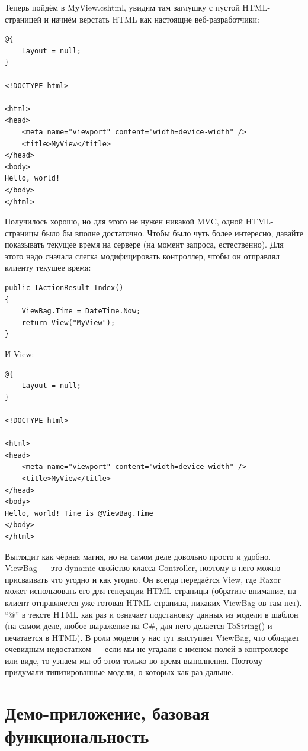 \documentclass[a5paper]{article}
\begin{document}
Теперь пойдём в MyView.cshtml, увидим там заглушку с пустой HTML-страницей и начнём верстать HTML как настоящие веб-разработчики:

\begin{verbatim}
@{
    Layout = null;
}

<!DOCTYPE html>

<html>
<head>
    <meta name="viewport" content="width=device-width" />
    <title>MyView</title>
</head>
<body>
Hello, world!
</body>
</html>
\end{verbatim}

Получилось хорошо, но для этого не нужен никакой MVC, одной HTML-страницы было бы вполне достаточно. Чтобы было чуть более интересно, давайте показывать текущее время на сервере (на момент запроса, естественно). Для этого надо сначала слегка модифицировать контроллер, чтобы он отправлял
клиенту текущее время:

\begin{verbatim}
public IActionResult Index()
{
    ViewBag.Time = DateTime.Now;
    return View("MyView");
}
\end{verbatim}

И View:

\begin{verbatim}
@{
    Layout = null;
}

<!DOCTYPE html>

<html>
<head>
    <meta name="viewport" content="width=device-width" />
    <title>MyView</title>
</head>
<body>
Hello, world! Time is @ViewBag.Time
</body>
</html>
\end{verbatim}

Выглядит как чёрная магия, но на самом деле довольно просто и удобно. ViewBag --- это dynamic-свойство класса Controller, поэтому в него можно присваивать что угодно и как угодно. Он всегда передаётся View, где Razor может использовать его для генерации HTML-страницы 
(обратите внимание, на клиент отправляется уже готовая HTML-страница, никаких ViewBag-ов там нет). ``@'' в тексте HTML как раз и означает подстановку данных из модели в шаблон (на самом деле, любое выражение на C\#, для него делается ToString() и печатается в HTML). В роли модели у нас тут
выступает ViewBag, что обладает очевидным недостатком --- если мы не угадали с именем полей в контроллере или виде, то узнаем мы об этом только во время выполнения. Поэтому придумали типизированные модели, о которых как раз дальше.

\section{Демо-приложение, базовая функциональность}
\end{document}
